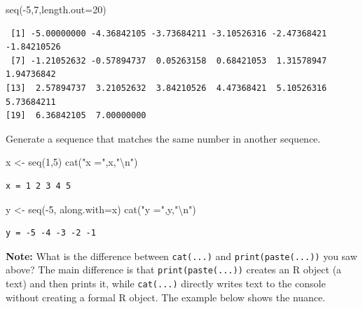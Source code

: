 \documentclass[
  letterpaper,
  DIV=11,
  numbers=noendperiod]{scrreprt}
\newenvironment{Shaded}{\begin{snugshade}}{\end{snugshade}}
\newcommand{\AttributeTok}[1]{\textcolor[rgb]{0.40,0.45,0.13}{#1}}
\newcommand{\DecValTok}[1]{\textcolor[rgb]{0.68,0.00,0.00}{#1}}
\newcommand{\FunctionTok}[1]{\textcolor[rgb]{0.28,0.35,0.67}{#1}}
\newcommand{\NormalTok}[1]{\textcolor[rgb]{0.00,0.23,0.31}{#1}}
\newcommand{\OtherTok}[1]{\textcolor[rgb]{0.00,0.23,0.31}{#1}}
\newcommand{\SpecialCharTok}[1]{\textcolor[rgb]{0.37,0.37,0.37}{#1}}
\newcommand{\StringTok}[1]{\textcolor[rgb]{0.13,0.47,0.30}{#1}}
\begin{document}
\begin{Shaded}
\begin{Highlighting}[]
\FunctionTok{seq}\NormalTok{(}\SpecialCharTok{{-}}\DecValTok{5}\NormalTok{,}\DecValTok{7}\NormalTok{,}\AttributeTok{length.out=}\DecValTok{20}\NormalTok{)}
\end{Highlighting}
\end{Shaded}

\begin{verbatim}
 [1] -5.00000000 -4.36842105 -3.73684211 -3.10526316 -2.47368421 -1.84210526
 [7] -1.21052632 -0.57894737  0.05263158  0.68421053  1.31578947  1.94736842
[13]  2.57894737  3.21052632  3.84210526  4.47368421  5.10526316  5.73684211
[19]  6.36842105  7.00000000
\end{verbatim}

Generate a sequence that matches the same number in another sequence.

\begin{Shaded}
\begin{Highlighting}[]
\NormalTok{x }\OtherTok{\textless{}{-}} \FunctionTok{seq}\NormalTok{(}\DecValTok{1}\NormalTok{,}\DecValTok{5}\NormalTok{)}
\FunctionTok{cat}\NormalTok{(}\StringTok{"x ="}\NormalTok{,x,}\StringTok{"}\SpecialCharTok{\textbackslash{}n}\StringTok{"}\NormalTok{)}
\end{Highlighting}
\end{Shaded}

\begin{verbatim}
x = 1 2 3 4 5 
\end{verbatim}

\begin{Shaded}
\begin{Highlighting}[]
\NormalTok{y }\OtherTok{\textless{}{-}} \FunctionTok{seq}\NormalTok{(}\SpecialCharTok{{-}}\DecValTok{5}\NormalTok{, }\AttributeTok{along.with=}\NormalTok{x)}
\FunctionTok{cat}\NormalTok{(}\StringTok{"y ="}\NormalTok{,y,}\StringTok{"}\SpecialCharTok{\textbackslash{}n}\StringTok{"}\NormalTok{)}
\end{Highlighting}
\end{Shaded}

\begin{verbatim}
y = -5 -4 -3 -2 -1 
\end{verbatim}

\textbf{Note:} What is the difference between \texttt{cat(...)} and
\texttt{print(paste(...))} you saw above? The main difference is that
\texttt{print(paste(...))} creates an R object (a text) and then prints
it, while \texttt{cat(...)} directly writes text to the console without
creating a formal R object. The example below shows the nuance.
\end{document}
